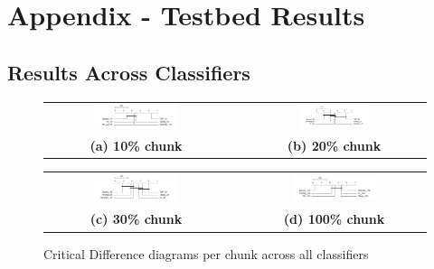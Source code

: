 \appendix
\chapter{Appendix - Testbed Results}
  \section{Results Across Classifiers}
  \label{AppendixAcross}
  \begin{figure} [!htb]
    \centering
    \begin{tabular}{ccc}
    \includegraphics[width=0.49\textwidth]{./Chapters/06 Results/cd_f_score_across_10pct_with_dummy.png} & & 
    \includegraphics[width=0.40\textwidth]{./Chapters/06 Results/cd_f_score_across_20pct_with_dummy.png} \\
    \textbf{(a) 10\% chunk} & & \textbf{(b) 20\% chunk} \\[6pt]
    \end{tabular}
    \begin{tabular}{ccc}
    \includegraphics[width=0.49\textwidth]{./Chapters/06 Results/cd_f_score_across_30pct_with_dummy.png} & & 
    \includegraphics[width=0.49\textwidth]{./Chapters/06 Results/cd_f_score_across_100pct_with_dummy.png} \\
    \textbf{(c) 30\% chunk} & & \textbf{(d) 100\% chunk}  \\[6pt]
    \end{tabular}
    \caption{Critical Difference diagrams per chunk across all classifiers}
  \end{figure}

